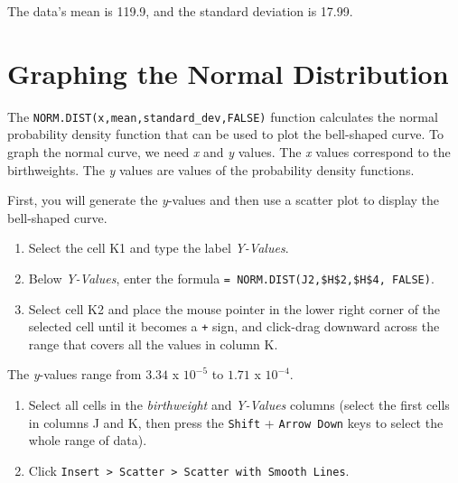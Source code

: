 \documentclass[
]{book}
\providecommand{\tightlist}{%
  \setlength{\itemsep}{0pt}\setlength{\parskip}{0pt}}
\begin{document}
The data's mean is 119.9, and the standard deviation is 17.99.

\hypertarget{graphing-the-normal-distribution}{%
\section{Graphing the Normal Distribution}\label{graphing-the-normal-distribution}}

The \texttt{NORM.DIST(x,mean,standard\_dev,FALSE)} function calculates the normal probability density function that can be used to plot the bell-shaped curve. To graph the normal curve, we need \emph{x} and \emph{y} values. The \emph{x} values correspond to the birthweights. The \emph{y} values are values of the probability density functions.

First, you will generate the \emph{y}-values and then use a scatter plot to display the bell-shaped curve.

\begin{enumerate}
\def\labelenumi{\arabic{enumi}.}
\tightlist
\item
  Select the cell K1 and type the label \emph{Y-Values}.
\item
  Below \emph{Y-Values}, enter the formula \texttt{=\ NORM.DIST(J2,\$H\$2,\$H\$4,\ FALSE)}.
\item
  Select cell K2 and place the mouse pointer in the lower right corner of the selected cell until it becomes a \texttt{+} sign, and click-drag downward across the range that covers all the values in column K.
\end{enumerate}

The \emph{y}-values range from \(3.34\) x \(10^{-5}\) to \(1.71\) x \(10^{-4}\).

\begin{enumerate}
\def\labelenumi{\arabic{enumi}.}
\setcounter{enumi}{3}
\tightlist
\item
  Select all cells in the \emph{birthweight} and \emph{Y-Values} columns (select the first cells in columns J and K, then press the \texttt{Shift} + \texttt{Arrow\ Down} keys to select the whole range of data).
\item
  Click \texttt{Insert\ \textgreater{}\ Scatter\ \textgreater{}\ Scatter\ with\ Smooth\ Lines}.
\end{enumerate}
\end{document}
